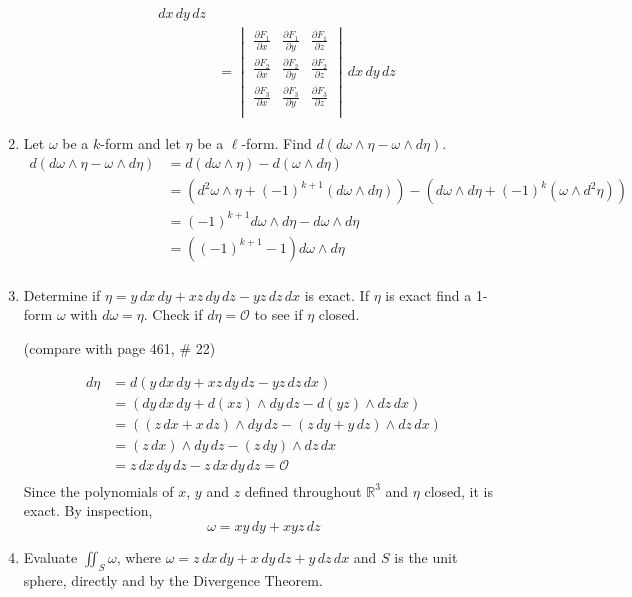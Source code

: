 \documentclass{article}
\newcommand{\partis}[2]{\frac{\partial #2}{\partial #1}}
\begin{document}
\begin{enumerate}
\begin{enumerate}
\begin{align*}
                                \, dx \, dy \, dz \\
                &=
                \begin{vmatrix}
                    \partis{x}{F_1} & \partis{y}{F_1} & \partis{z}{F_1} \\
                    \partis{x}{F_2} & \partis{y}{F_2} & \partis{z}{F_2} \\
                    \partis{x}{F_3} & \partis{y}{F_3} & \partis{z}{F_3} \\
                \end{vmatrix} \, dx \, dy \, dz
            \end{align*} 
    \end{enumerate}
    \newpage
    \item Let $\omega$ be a $k$-form and let $\eta$ be a $\ell$-form. 
    Find $d(d\omega \wedge \eta - \omega \wedge d\eta)$.
        \begin{align*}
            d(d\omega \wedge \eta - \omega \wedge d\eta) 
            &= d(d\omega \wedge \eta) - d(\omega \wedge d\eta) \\
            &= (d^2 \omega \wedge \eta 
            + (-1)^{k+1} (d \omega \wedge d \eta)) 
            - (d \omega \wedge d \eta + (-1)^k (\omega \wedge d^2 \eta)) \\
            &= (-1)^{k+1} d \omega \wedge d \eta - d \omega \wedge d \eta \\
            &= ((-1)^{k+1} - 1) d \omega \wedge d \eta \\
        \end{align*} 
    \item Determine if $\eta = y \, dx \, dy + xz \, dy \, dz - yz \, dz \, dx$
    is exact. If $\eta$ is exact find a 1-form $\omega$ with $d\omega = \eta$.
    Check if $d\eta = \mathcal{O}$ to see if $\eta$ closed.

    (compare with page 461, \# 22)

    \begin{align*}
        d\eta &= d (y\, dx \, dy + xz \, dy \, dz - yz \, dz \, dx) \\
        &= (dy \, dx \, dy + d(xz)\wedge  dy \, dz - d(yz) \wedge dz \, dx) \\
        &= ((z \, dx + x \, dz)\wedge  dy \, dz 
        - (z\, dy + y \, dz) \wedge dz \, dx) \\
        &= (z \, dx) \wedge dy \, dz - (z\, dy) \wedge dz \, dx \\
        &= z \, dx \, dy \, dz - z \, dx \, dy \, dz = \mathcal{O}\\
    \end{align*}
    Since the polynomials of $x$, $y$ and $z$ defined throughout $\mathbb{R}^3$
    and $\eta$ closed, it is exact. By inspection, 
    \[ \omega = xy \, dy + xyz \, dz \]
    \newpage
    \item
    Evaluate $\displaystyle \iint_S \omega$, where 
    $\omega = z\, dx \, dy + x \, dy \, dz + y \, dz \, dx$ 
    and $S$ is the unit sphere, directly and by the Divergence Theorem.


\end{enumerate}
\end{document}
